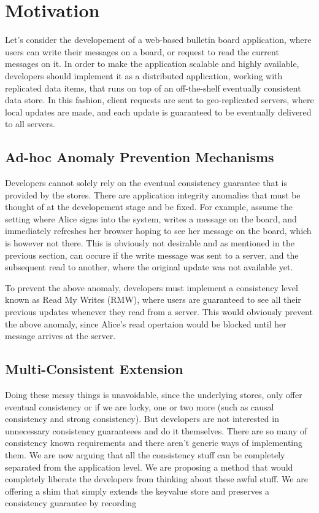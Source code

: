\section{Motivation}

Let's consider the developement of a web-based bulletin board application, where
users can write their messages on a board, or request to read the current
messages on it.
In order to make the application scalable and highly
available, developers should implement it as a distributed application, working
with replicated data items, that runs on top of an off-the-shelf
eventually consistent data store. In this fashion, client requests are
sent to geo-replicated servers, where local updates are made, and each
update is guaranteed to be eventually delivered to all servers. 



\subsection{Ad-hoc Anomaly Prevention Mechanisms}
Developers cannot solely rely on the eventual consistency guarantee that
is provided by the stores. There are application integrity anomalies
that must be thought of at the developement stage and be fixed. For
example, assume the setting where Alice signs into the system, writes a
message on the board, and immediately refreshes her browser hoping to see
her message on the board, which is however not there. This is obviously
not desirable and as mentioned in
the previous section,  can occure if
the write message was sent to a server, and the subsequent read to
another, where the original update was not available yet. 

To prevent the above anomaly, developers must implement a consistency level known as 
Read My Writes (RMW), where users are guaranteed to see all their
previous updates whenever they read from a server. This would
obviously prevent the above anomaly, since Alice's read opertaion would
be blocked until her message arrives at the server. 





\subsection{Multi-Consistent Extension}
Doing these messy things is unavoidable, since the underlying stores,
only offer eventual consistency or if we are locky, one or two more
(such as causal consistency and strong consistency). But developers are
not interested in unnecessary consistency guaranteees and do it
themselves. There are so many of consistency known requirements and
there aren't generic ways of implementing them.
We are now arguing that all the consistency stuff can be
completely separated from the application level. We are proposing a
method that would completely liberate the developers from thinking about
these awful stuff. We are offering a shim that simply extends the
keyvalue store and preserves a consistency guarantee by recording
